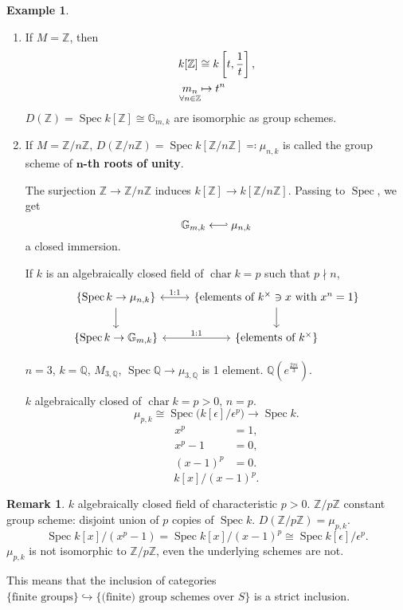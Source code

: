 \documentclass[12pt]{article}
\DeclareMathOperator{\Spec}{Spec}
\DeclareMathOperator{\chara}{char}
\theoremstyle{definition}
\newtheorem*{remark}{Remark}
\newtheorem*{example}{Example}
\begin{document}
\begin{example}
\begin{enumerate}[label=\arabic*)]
\item If $M=\mathbb Z$, then
\begin{align*}
k[\mathbb Z]&\cong k\left[t,\frac1t\right],\\\underset{\mathclap{\forall n\in\mathbb Z}}{m_n}&\mapsto t^n
\end{align*}
$D(\mathbb Z)=\Spec k[\mathbb Z]\cong\mathbb G_{m,k}$ are isomorphic as group schemes.

\item If $M=\mathbb Z/n\mathbb Z$, $D(\mathbb Z/n\mathbb Z)=\Spec k[\mathbb Z/n\mathbb Z]\eqqcolon\mu_{n,k}$ is called the group scheme of \textbf{$\boldsymbol n$-th roots of unity}.

The surjection $\mathbb Z\rightarrow\mathbb Z/n\mathbb Z$ induces $k[\mathbb Z]\rightarrow k[\mathbb Z/n\mathbb Z]$. Passing to $\Spec$, we get
\[\mathbb G_{m,k}\longleftarrow\joinrel\rhook\mu_{n,k}\]
a closed immersion.

If $k$ is an algebraically closed field of $\chara k=p$ such that $p\nmid n$,
\[\begin{tikzcd}\{\Spec k\rightarrow\mu_{n,k}\}\arrow[r,<->,"1:1"]\arrow[d]&\{\text{elements of }k^\times\ni x\text{ with }x^n=1\}\arrow[d]\\\{\Spec k\rightarrow\mathbb G_{m,k}\}\arrow[r,<->,"1:1"]&\{\text{elements of }k^\times\}\end{tikzcd}\]

$n=3$, $k=\mathbb Q$, $M_{3,\mathbb Q}$, $\Spec\mathbb Q\rightarrow\mu_{3,\mathbb Q}$ is 1 element. $\mathbb Q(e^{\frac{2\pi i}3})$.

$k$ algebraically closed of $\chara k=p>0$, $n=p$.
\[\mu_{p,k}\cong\Spec\big(k[\epsilon]/\epsilon^p\big)\longrightarrow\Spec k.\]
\begin{align*}
x^p&=1,\\x^p-1&=0,\\(x-1)^p&=0.
\end{align*}
\[k[x]/(x-1)^p.\]
\end{enumerate}
\end{example}

\begin{remark}
$k$ algebraically closed field of characteristic $p>0$. $\mathbb Z/p\mathbb Z$ constant group scheme: disjoint union of $p$ copies of $\Spec k$. $D(\mathbb Z/p\mathbb Z)=\mu_{p,k}$.
\[\Spec k[x]/(x^p-1)=\Spec k[x]/(x-1)^p\cong\Spec k[\epsilon]/\epsilon^p.\]
$\mu_{p,k}$ is not isomorphic to $\mathbb Z/p\mathbb Z$, even the underlying schemes are not.

This means that the inclusion of categories $\{\text{finite groups}\}\hookrightarrow\{\text{(finite) group schemes over }S\}$ is a strict inclusion.
\end{remark}
\end{document}
